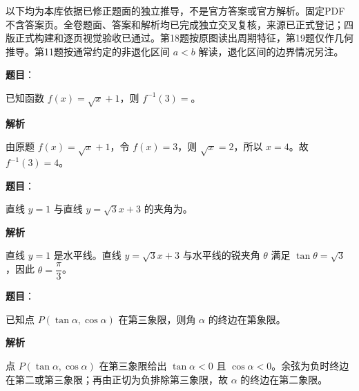 

\begin{gktip}
以下均为本库依据已修正题面的独立推导，不是官方答案或官方解析。固定PDF不含答案页。全卷题面、答案和解析均已完成独立交叉复核，来源已正式登记；四版正式构建和逐页视觉验收已通过。第18题按原图读出周期特征，第19题仅作几何推导。第11题按通常约定的非退化区间 $a<b$ 解读，退化区间的边界情况另注。
\end{gktip}

\begin{answer}

\textbf{题目}：

已知函数 $f(x)=\sqrt{x}+1$，则 $f^{-1}(3)=$\underline{\qquad}。

\textbf{解析}

由原题 $f(x)=\sqrt{x}+1$，令 $f(x)=3$，则 $\sqrt{x}=2$，所以 $x=4$。故 $f^{-1}(3)=4$。


\end{answer}
\begin{answer}

\textbf{题目}：

直线 $y=1$ 与直线 $y=\sqrt3x+3$ 的夹角为\underline{\qquad}。

\textbf{解析}

直线 $y=1$ 是水平线。直线 $y=\sqrt3x+3$ 与水平线的锐夹角 $\theta$ 满足 $\tan\theta=\sqrt3$，因此 $\theta=\dfrac{\pi}{3}$。


\end{answer}
\begin{answer}

\textbf{题目}：

已知点 $P(\tan\alpha,\cos\alpha)$ 在第三象限，则角 $\alpha$ 的终边在第\underline{\qquad}象限。

\textbf{解析}

点 $P(\tan\alpha,\cos\alpha)$ 在第三象限给出 $\tan\alpha<0$ 且 $\cos\alpha<0$。余弦为负时终边在第二或第三象限；再由正切为负排除第三象限，故 $\alpha$ 的终边在第二象限。


\end{answer}
